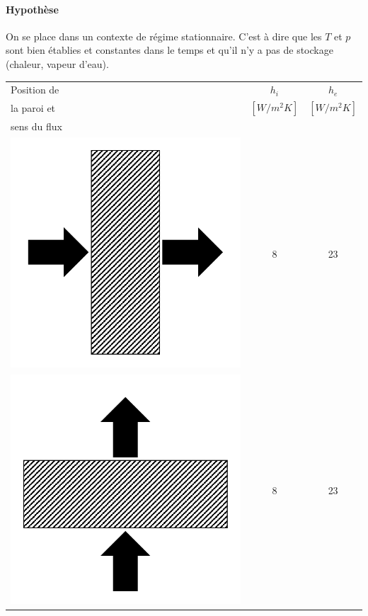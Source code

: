 \documentclass[11pt]{report}
\begin{document}
\paragraph{Hypothèse} On se place dans un contexte de régime stationnaire. C'est à dire que les $T$ et $p$ sont bien établies et constantes dans le temps et qu'il n'y a pas de stockage (chaleur, vapeur d'eau).
\begin{center}
\begin{tabular}{m{2cm}c c}
Position de  & $h_i$  & $h_e$ \\
la paroi et & $ [W/m^2 K]$ & $ [W/m^2 K]$\\
sens du flux & & \\
\hline
\includegraphics[scale=0.07]{mur} & 8 & 23 \\
\includegraphics[scale=0.07]{plafond} & 8 & 23 \\

\end{tabular}
\end{center}
\end{document}
